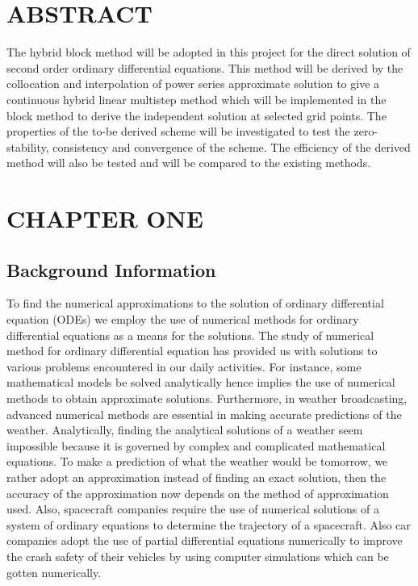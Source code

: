 \documentclass[12pt]{report}
\begin{document}
\chapter*{ABSTRACT}
%
\noindent The hybrid block method will be adopted in this project for the direct solution of second order ordinary differential equations. This method will be derived by the collocation and interpolation of power series approximate solution to give a continuous hybrid linear multistep method which will be implemented in the block method to derive the independent solution at selected grid points. The properties of the to-be derived scheme will be investigated to test the zero-stability, consistency and convergence of the scheme. The efficiency of the derived method will also be tested and will be compared to the existing methods.
\tableofcontents

%
%
\cleardoublepage
{}
\chapter{CHAPTER ONE}
\section{Background Information}
\noindent To find the numerical approximations to the solution of ordinary differential equation (ODEs) we employ the use of numerical methods for ordinary differential equations as a means for the solutions. The study of numerical method for ordinary differential equation has provided us with solutions to various problems encountered in our daily activities. For instance, some mathematical models be solved analytically hence implies the use of numerical methods to obtain approximate solutions. Furthermore, in weather broadcasting, advanced numerical methods are essential in making accurate predictions of the weather. Analytically, finding the analytical solutions of a weather seem impossible because it is governed by complex and complicated mathematical equations. To make a prediction of what the weather would be tomorrow, we rather adopt an approximation instead of finding an exact solution, then the accuracy of the approximation now depends on the method of approximation used. Also, spacecraft companies require the use of numerical solutions of a system of ordinary equations to determine the trajectory of a spacecraft. Also car companies adopt the use of partial differential equations numerically to improve the crash safety of their vehicles by using computer simulations which can be gotten numerically.
\end{document}
